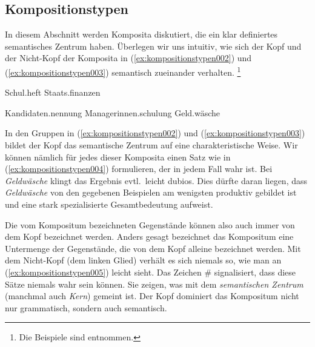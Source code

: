 \subsection{Kompositionstypen}
\label{sec:kompositionstypen}


In diesem Abschnitt werden Komposita diskutiert, die ein klar definiertes semantisches Zentrum haben.
Überlegen wir uns intuitiv, wie sich der Kopf und der Nicht-Kopf der Komposita in (\ref{ex:kompositionstypen002}) und (\ref{ex:kompositionstypen003}) semantisch zueinander verhalten.%
\footnote{Die Beispiele sind \citealp[217ff.]{Eisenberg2013a} entnommen.}

\begin{exe}
  \ex\label{ex:kompositionstypen002}
  \begin{xlist}
    \ex Schul.heft
    \ex Staats.finanzen
  \end{xlist}
  \ex\label{ex:kompositionstypen003}
  \begin{xlist}
    \ex Kandidaten.nennung
    \ex Managerinnen.schulung
    \ex Geld.wäsche
  \end{xlist}
\end{exe}

In den Gruppen in (\ref{ex:kompositionstypen002}) und (\ref{ex:kompositionstypen003}) bildet der Kopf das semantische Zentrum auf eine charakteristische Weise.
Wir können nämlich für jedes dieser Komposita einen Satz wie in (\ref{ex:kompositionstypen004}) formulieren, der in jedem Fall wahr ist.
Bei \textit{Geldwäsche} klingt das Ergebnis evtl.\ leicht dubios.
Dies dürfte daran liegen, dass \textit{Geldwäsche} von den gegebenen Beispielen am wenigsten produktiv gebildet ist und eine stark spezialisierte Gesamtbedeutung aufweist.

\begin{exe}
  \ex\label{ex:kompositionstypen004}
  \begin{xlist}
  \end{xlist}
\end{exe}

Die vom Kompositum bezeichneten Gegenstände können also auch immer von dem Kopf bezeichnet werden.
Anders gesagt bezeichnet das Kompositum eine Untermenge der Gegenstände, die von dem Kopf alleine bezeichnet werden.
Mit dem Nicht-Kopf (dem linken Glied) verhält es sich niemals so, wie man an (\ref{ex:kompositionstypen005}) leicht sieht.
Das Zeichen \# signalisiert, dass diese Sätze niemals wahr sein können.
Sie zeigen, was mit dem \textit{semantischen Zentrum} (manchmal auch \textit{Kern}) gemeint ist.
Der Kopf dominiert das Kompositum nicht nur grammatisch, sondern auch semantisch.

